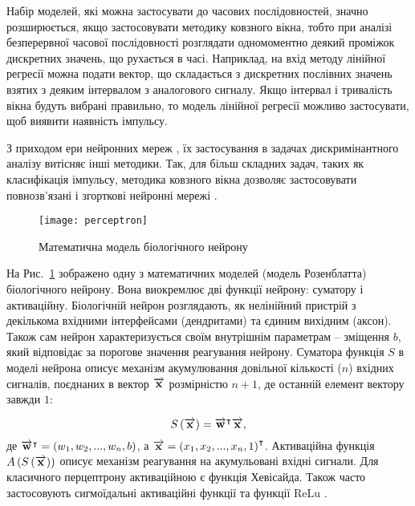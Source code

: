 
Набір моделей, які можна застосувати до часових послідовностей, значно 
розширюється, якщо застосовувати методику ковзного вікна, тобто при аналізі 
безперервної часової послідовності розглядати одномоментно деякий проміжок 
дискретних значень, що рухається в часі. Наприклад, на вхід методу лінійної 
регресії \cite{imp:Xin2009} можна подати вектор, що складається з дискретних 
послівних значень взятих з деяким інтервалом з аналогового сигналу. Якщо 
інтервал і тривалість вікна будуть вибрані правильно, то модель лінійної
регресії можливо застосувати, щоб виявити наявність імпульсу. 

З приходом ери нейронних мереж \cite{imp:Rosenblatt1957}, їх застосування в
задачах дискримінантного аналізу витісняє інші методики. Так, для більш 
складних задач, таких як класифікація імпульсу, методика ковзного вікна 
дозволяє застосовувати повнозв'язані і згорткові нейронні мережі 
\cite{imp:Plakhtii2019}.

\begin{figure}[htbp] \begin{center}
\texttt{[image: perceptron]}
\caption{Математична модель біологічного нейрону}
\label{fig:perceptron}
\end{center} \end{figure}

На Рис.~\ref{fig:perceptron} зображено одну з математичних моделей (модель 
Розенблатта) біологічного нейрону. Вона виокремлює дві функції нейрону: 
суматору і активаційну. Біологічній нейрон розглядають, як нелінійний пристрій 
з декількома вхідними інтерфейсами (дендритами) та єдиним вихідним (аксон).
Також сам нейрон характеризується своїм внутрішнім параметрам -- зміщення 
$ b $, який відповідає за порогове значення реагування нейрону. Суматора 
функція $ S $ в моделі нейрона описує механізм акумулювання довільної 
кількості ($ n $) вхідних сигналів, поєднаних в вектор $ \overrightarrow{\mathbf x} $ 
розмірністю $ n + 1 $, де останній елемент вектору завжди $ 1 $:

\begin{equation}
S \left( \overrightarrow{\mathbf x} \right) = \overrightarrow{\mathbf w}^\intercal \overrightarrow{\mathbf x},
\end{equation}
%
де $ \overrightarrow{\mathbf w}^\intercal = \left( w_1, w_2, ..., w_n, b \right) $, а
$ \overrightarrow{\mathbf x} = \left( x_1, x_2, ..., x_n, 1 \right)^\intercal $.
Активаційна функція $ A \left( S \left( \overrightarrow{\mathbf x} \right) \right) $ описує механізм 
реагування на акумульовані вхідні сигнали. Для класичного перцептрону 
активаційною є функція Хевісайда. Також часто застосовують сигмоїдальні 
активаційні функції та функції ReLu \cite{imp:Kussul2004}.

